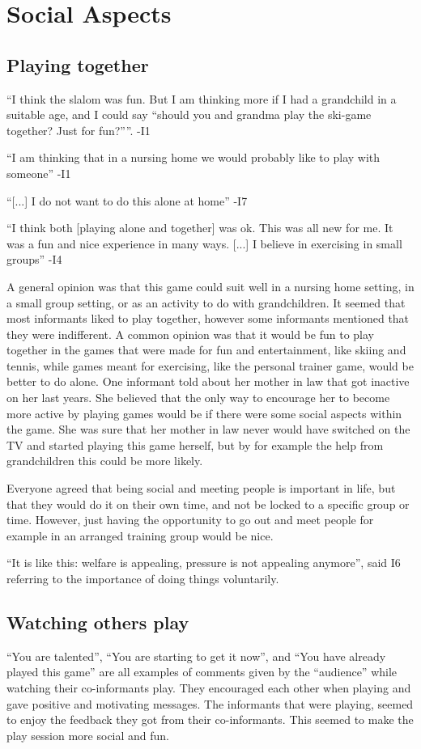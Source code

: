 \section{Social Aspects}
\subsection{Playing together}
“I think the slalom was fun. But I am thinking more if I had a grandchild in a suitable age, and I could say “should you and grandma play the ski-game together? Just for fun?””. -I1

“I am thinking that in a nursing home we would probably like to play with someone” -I1

“[...] I do not want to do this alone at home” -I7

“I think both [playing alone and together] was ok. This was all new for me. It was a fun and nice experience in many ways. [...] I believe in  exercising in small groups” -I4

A general opinion was that this game could suit well in a nursing home setting, in a small group setting, or as an activity to do with grandchildren. It seemed that most informants liked to play together, however some informants mentioned that they were indifferent. A common opinion was that it would be fun to play together in the games that were made for fun and entertainment, like skiing and tennis, while games meant for exercising, like the personal trainer game, would be better to do alone. One informant told about her mother in law that got inactive on her last years. She believed that the only way to encourage her to become more active by playing games would be if there were some social aspects within the game. She was sure that her mother in law never would have switched on the TV and started playing this game herself, but by for example the help from grandchildren this could be more likely.

Everyone agreed that being social and meeting people is important in life, but that they would do it on their own time, and not be locked to a specific group or time. However, just having the opportunity to go out and meet people for example in an arranged training group would be nice. 

“It is like this: welfare is appealing, pressure is not appealing anymore”, said I6 referring to the importance of doing things voluntarily. 

\subsection{Watching others play}
“You are talented”, “You are starting to get it now”, and “You have already played this game” are all examples of comments given by the “audience” while watching their co-informants play. They encouraged each other when playing and gave positive and motivating messages. The informants that were playing, seemed to enjoy the feedback they got from their co-informants. This seemed to make the play session more social and fun.  

